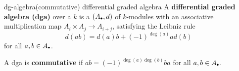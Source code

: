 
\begin{topic}{dg-algebra}{(commutative) differential graded algebra}
    A \textbf{differential graded algebra (dga)} over a  $k$ is a  $(A_\bdot, d)$ of $k$-modules with an associative multiplication map $A_i \times A_j \to A_{i + j}$, satisfying the Leibniz rule
    \[ d(ab) = d(a) b + (-1)^{\deg(a)} a d(b) \]
    for all $a, b \in A_\bdot$.
    
    A dga is \textbf{commutative} if $ab = (-1)^{\deg(a) \deg(b)} ba$ for all $a, b \in A_\bdot$.
\end{topic}
